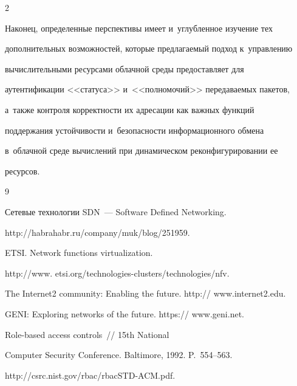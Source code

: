\begin{multicols}{2}
  


  Наконец, определенные перспективы имеет и~углубленное изучение тех 


дополнительных возможностей, которые предлагаемый подход к~управ\-ле\-нию 


вычислительными ресурсами облачной среды предоставляет для 


аутентификации <<статуса>> и~<<полномочий>> передаваемых пакетов, 


а~также контроля корректности их адресации как важных функций 


поддержания устойчивости и~без\-опас\-ности информационного обмена 


в~облачной среде вычислений при динамическом реконфигурировании ее 


ресурсов.





{\small\frenchspacing


 {%




 \begin{thebibliography}{9}




      Сетевые технологии SDN~--- Software Defined Networking. 


{\sf http://habrahabr.ru/company/muk/blog/251959}.




    ETSI. Network functions virtualization. 


    {\sf http://www. etsi.org/technologies-clusters/technologies/nfv}.




   The Internet2 community: Enabling the future. {\sf http:// www.internet2.edu}.




 GENI: Exploring networks of the future. {\sf https:// www.geni.net}.







 Role-based access controls~// 15th National 


Computer Security Conference. Baltimore, 1992. P.~554--563.


{\sf http://csrc.nist.gov/rbac/rbacSTD-\linebreak ACM.pdf}.



\end{thebibliography}}}
\end{multicols}
